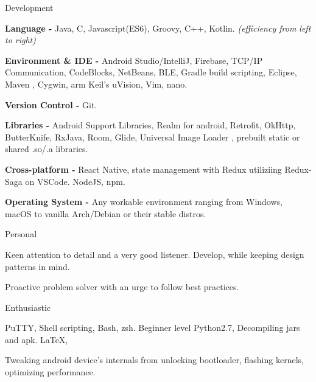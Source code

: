 

\begin{skillsentries}
  
  \skillsentry
    {Development} %
    {
      \begin{skillsitems} %
        \item {\textbf{Language -} Java, C, Javascript(ES6), Groovy, C++, Kotlin. \textsl{(efficiency from left to right)}}
        \item {\textbf{Environment \& IDE -} Android Studio/IntelliJ, Firebase, TCP/IP Communication, CodeBlocks, NetBeans, BLE, Gradle build scripting, Eclipse, Maven
        , Cygwin, arm Keil's uVision, Vim, nano.}
        \item {\textbf{Version Control -} Git.}
        \item {\textbf{Libraries -} Android Support Libraries, Realm for android, Retrofit, OkHttp, ButterKnife, RxJava, Room, Glide, Universal Image Loader
        , prebuilt static or shared .so/.a libraries.}
        \item {\textbf{Cross-platform -} React Native, state management with Redux utiliziing Redux-Saga on VSCode. NodeJS, npm.}
        \item {\textbf{Operating System - } Any workable environment ranging from Windows, macOS to vanilla Arch/Debian or their stable distros.}
      \end{skillsitems}
    }

    
    \skillsentry
    {Personal} %
    {
      \begin{skillsitems} %
        \item {Keen attention to detail and a very good listener. Develop, while keeping design patterns in mind.}
        \item {Proactive problem solver with an urge to follow best practices.}
      \end{skillsitems}
      }
      
      \skillsentry
      {Enthusiastic} %
      {
        \begin{skillsitems} %
          \item {PuTTY, Shell scripting, Bash, zsh. Beginner level Python2.7, Decompiling jars and apk. LaTeX,}
          \item {Tweaking android device's internals from unlocking bootloader, flashing kernels, optimizing performance.}
        \end{skillsitems}
      }
\end{skillsentries}
